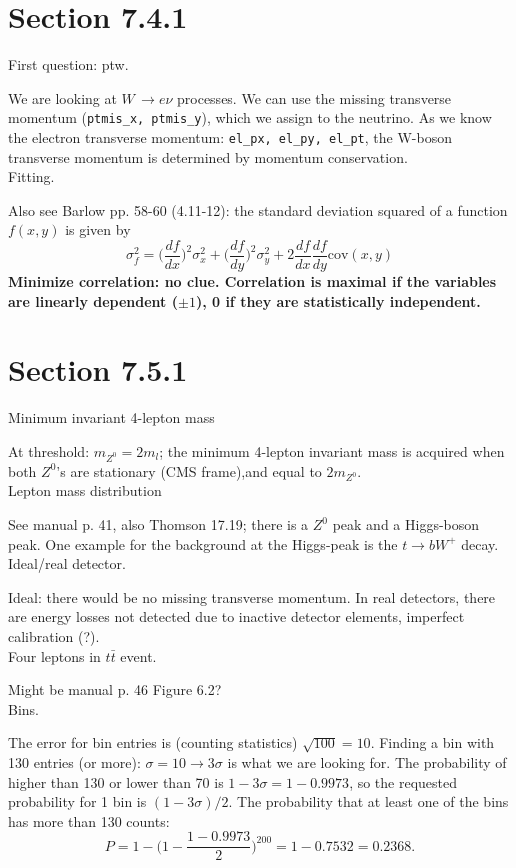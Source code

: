 \documentclass{article}
\begin{document}
\section{Section 7.4.1}
First question: ptw.
\par We are looking at $W \, \rightarrow e \nu$ processes. We can use the missing transverse momentum (\texttt{ptmis\_x, ptmis\_y}), which we assign to the neutrino. As we know the electron transverse momentum: \texttt{el\_px, el\_py, el\_pt}, the W-boson transverse momentum is determined by momentum conservation.\\[14pt]
Fitting.
\par Also see Barlow pp. 58-60 (4.11-12): the standard deviation squared of a function $f(x,y)$ is given by
\begin{equation}
\sigma_f^2 = \Big(\frac{df}{dx}\Big)^2 \sigma_x^2 + \Big( \frac{df}{dy} \Big)^2 \sigma_y^2 + 2 \frac{df}{dx}\frac{df}{dy}\text{cov}(x,y)
\end{equation}
\textbf{Minimize correlation: no clue. Correlation is maximal if the variables are linearly dependent ($\pm 1$), 0 if they are statistically independent.}
\section{Section 7.5.1}
Minimum invariant 4-lepton mass
\par At threshold: $m_{Z^0} = 2 m_l$; the minimum 4-lepton invariant mass is acquired when both $Z^0$'s are stationary (CMS frame),and equal to $2m_{Z^0}$.\\[14pt]
Lepton mass distribution
\par See manual p. 41, also Thomson 17.19; there is a $Z^0$ peak and a Higgs-boson peak. One example for the background at the Higgs-peak is the $t \rightarrow bW^+$ decay.\\[14pt]
Ideal/real detector.
\par Ideal: there would be no missing transverse momentum. In real detectors, there are energy losses not detected due to inactive detector elements, imperfect calibration (?).\\[14pt]
Four leptons in $t \bar{t}$ event.
\par Might be manual p. 46 Figure 6.2?\\[14pt]
Bins.
\par The error for bin entries is (counting statistics) $\sqrt{100} = 10$. Finding a bin with 130 entries (or more): $\sigma = 10 \rightarrow 3\sigma$ is what we are looking for. The probability of higher than 130 or lower than 70 is $ 1- 3 \sigma = 1-0.9973$, so the requested probability for 1 bin is $(1-3\sigma)/2$. The probability that at least one of the bins has more than 130 counts:
\begin{equation}
P = 1 - \Big( 1 - \frac{1- 0.9973}{2} \Big)^{200} = 1-0.7532 = 0.2368.
\end{equation} 
\end{document}
